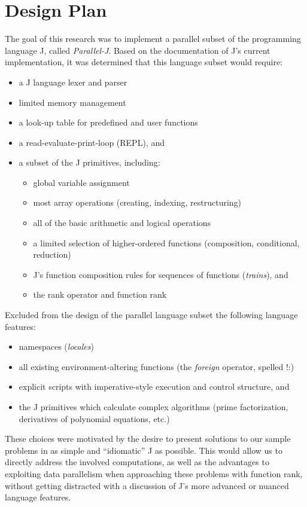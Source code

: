\section{Design Plan}
\label{desp}
The goal of this research was
to implement a parallel subset of the programming language J, called \textit{Parallel-J}.
Based on the documentation of J's current implementation\cite{ioj}, it was determined that this language subset would require:
\begin{itemize}
	\item a J language lexer and parser
	\item limited memory management
	\item a look-up table for predefined and user functions
	\item a read-evaluate-print-loop (REPL), and
	\item a subset of the J primitives, including: 
	\begin{itemize}
		\item global variable assignment
		\item most array operations (creating, indexing, restructuring)
		\item all of the basic arithmetic and logical operations
		\item a limited selection of higher-ordered functions (composition, conditional, reduction)
		\item J's function composition rules for sequences of functions (\textit{trains}), and
		\item the rank operator and function rank
	\end{itemize}
\end{itemize}

Excluded from the design of the parallel language subset the following language features: 
\begin{itemize}
	\item namespaces (\textit{locales})
	\item all existing environment-altering functions (the \textit{foreign} operator, spelled \ttfamily!:\normalfont)
	\item explicit scripts with imperative-style execution and control structure, and
	\item the J primitives which calculate complex algorithms (prime factorization, derivatives of polynomial equations, etc.)
\end{itemize}

These choices were motivated by the desire to present solutions to our sample problems in as simple and ``idiomatic'' J as possible.
This would allow us to directly address the involved computations, 
as well as the advantages to exploiting data parallelism when approaching these problems with function rank, 
without getting distracted with a discussion of J's more advanced or nuanced language features.

